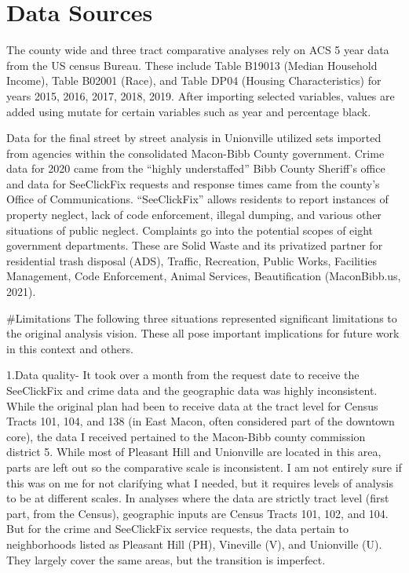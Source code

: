 \documentclass[
]{article}
\begin{document}
\hypertarget{data-sources}{%
\section{Data Sources}\label{data-sources}}

The county wide and three tract comparative analyses rely on ACS 5 year
data from the US census Bureau. These include Table B19013 (Median
Household Income), Table B02001 (Race), and Table DP04 (Housing
Characteristics) for years 2015, 2016, 2017, 2018, 2019. After importing
selected variables, values are added using mutate for certain variables
such as year and percentage black.

Data for the final street by street analysis in Unionville utilized sets
imported from agencies within the consolidated Macon-Bibb County
government. Crime data for 2020 came from the ``highly understaffed''
Bibb County Sheriff's office and data for SeeClickFix requests and
response times came from the county's Office of Communications.
``SeeClickFix'' allows residents to report instances of property
neglect, lack of code enforcement, illegal dumping, and various other
situations of public neglect. Complaints go into the potential scopes of
eight government departments. These are Solid Waste and its privatized
partner for residential trash disposal (ADS), Traffic, Recreation,
Public Works, Facilities Management, Code Enforcement, Animal Services,
Beautification (MaconBibb.us, 2021).

\#Limitations The following three situations represented significant
limitations to the original analysis vision. These all pose important
implications for future work in this context and others.

1.Data quality- It took over a month from the request date to receive
the SeeClickFix and crime data and the geographic data was highly
inconsistent. While the original plan had been to receive data at the
tract level for Census Tracts 101, 104, and 138 (in East Macon, often
considered part of the downtown core), the data I received pertained to
the Macon-Bibb county commission district 5. While most of Pleasant Hill
and Unionville are located in this area, parts are left out so the
comparative scale is inconsistent. I am not entirely sure if this was on
me for not clarifying what I needed, but it requires levels of analysis
to be at different scales. In analyses where the data are strictly tract
level (first part, from the Census), geographic inputs are Census Tracts
101, 102, and 104. But for the crime and SeeClickFix service requests,
the data pertain to neighborhoods listed as Pleasant Hill (PH),
Vineville (V), and Unionville (U). They largely cover the same areas,
but the transition is imperfect.
\end{document}
